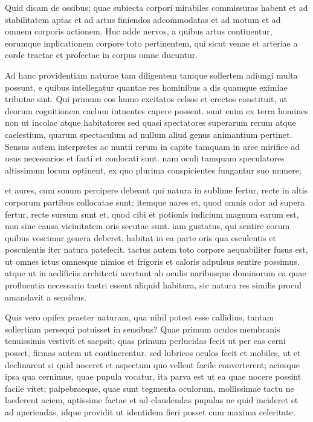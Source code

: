  Quid dicam de ossibus; quae subiecta corpori mirabiles commissuras habent et ad stabilitatem aptas et ad artus finiendos adcommodatas et ad motum et ad omnem corporis actionem. Huc adde nervos, a quibus artus continentur, eorumque inplicationem corpore toto pertinentem, qui sicut venae et arteriae a corde tractae et profectae in corpus omne ducuntur.

 Ad hanc providentiam naturae tam diligentem tamque sollertem adiungi multa possunt, e quibus intellegatur quantae res hominibus a dis quamque eximiae tributae sint. Qui primum eos humo excitatos celsos et erectos constituit, ut deorum cognitionem caelum intuentes capere possent. sunt enim ex terra homines non ut incolae atque habitatores sed quasi spectatores superarum rerum atque caelestium, quarum spectaculum ad nullum aliud genus animantium pertinet. Sensus autem interpretes ac nuntii rerum in capite tamquam in arce mirifice ad usus necessarios et facti et conlocati sunt. nam oculi tamquam speculatores altissimum locum optinent, ex quo plurima conspicientes fungantur suo munere;

 et aures, cum sonum percipere debeant qui natura in sublime fertur, recte in altis corporum partibus collocatae sunt; itemque nares et, quod omnis odor ad supera fertur, recte sursum sunt et, quod cibi et potionis iudicium magnum earum est, non sine causa vicinitatem oris secutae sunt. iam gustatus, qui sentire eorum quibus vescimur genera deberet, habitat in ea parte oris qua esculentis et posculentis iter natura patefecit. tactus autem toto corpore aequabiliter fusus est, ut omnes ictus omnesque nimios et frigoris et caloris adpulsus sentire possimus. atque ut in aedificiis architecti avertunt ab oculis naribusque dominorum ea quae profluentia necessario taetri essent aliquid habitura, sic natura res similis procul amandavit a sensibus.

 Quis vero opifex praeter naturam, qua nihil potest esse callidius, tantam sollertiam persequi potuisset in sensibus? Quae primum oculos membranis tenuissimis vestivit et saepsit; quas primum perlucidas fecit ut per eas cerni posset, firmas autem ut continerentur. sed lubricos oculos fecit et mobiles, ut et declinarent si quid noceret et aspectum quo vellent facile converterent; aciesque ipsa qua cernimus, quae pupula vocatur, ita parva est ut ea quae nocere possint facile vitet; palpebraeque, quae sunt tegmenta oculorum, mollissimae tactu ne laederent aciem, aptissime factae et ad claudendas pupulas ne quid incideret et ad aperiendas, idque providit ut identidem fieri posset cum maxima celeritate.


